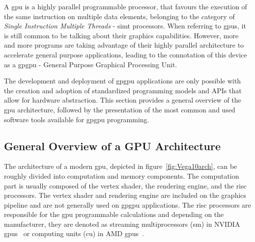 A \acrshort{gpu} is a highly parallel programmable processor, that favours the execution of the same instruction on multiple data elements, belonging to the category of \textit{Single Instruction Multiple Threads} - \acrshort{simt} processors. When referring to \acrshort{gpu}s, it is still common to be talking about their graphics capabilities. However, more and more programs are taking advantage of their highly parallel architecture to accelerate general purpose applications, leading to the connotation of this device as a \acrshort{gpgpu} - General Purpose Graphical Processing Unit.

The development and deployment of \acrshort{gpgpu} applications are only possible with the creation and adoption of standardized programming models and APIs that allow for hardware abstraction. This section provides a general overview of the \acrshort{gpu} architecture, followed by the presentation of the most common and used software tools available for \acrshort{gpgpu} programming.




\subsection{General Overview of a GPU Architecture}
The architecture of a modern \acrshort{gpu}, depicted in figure~\ref{fig:Vega10arch}, can be roughly divided into computation and memory components. The computation part is usually composed of the vertex shader, the rendering engine, and the \acrshort{risc} processors. The vertex shader and rendering engine are included on the graphics pipeline and are not generally used on \acrshort{gpgpu} applications. The \acrshort{risc} processors are responsible for the \acrshort{gpu} programmable calculations and depending on the manufacturer, they are denoted as streaming multiprocessors (\acrshort{sm}) in NVIDIA \acrshort{gpu}s~\cite{nvidia_cuda_2008} or computing units (\acrshort{cu}) in AMD \acrshort{gpu}s~\cite{amd_amd_2008}.  

